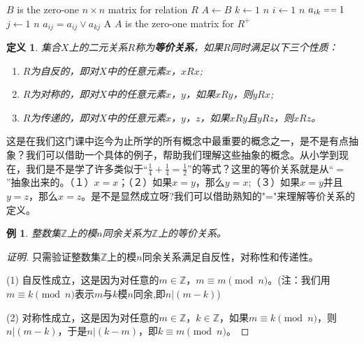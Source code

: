 \documentclass{book}[oneside]
\newtheorem{Def}{定义}[chapter]
\newtheorem{Example}{例}[chapter]
\begin{document}
\begin{CJK*}{UTF8}{gbsn}
    \begin{codebox}
    \zi \Comment $B$ is the zero-one $n \times n$ matrix for relation $R$
    \li $A \gets B$
    \li \For $k \gets 1$ \To $n$
    \li \Do
    \For $i \gets 1$ \To $n$
    \li \Do
     \If $a_{ik} \isequal 1$
    \li \Then
    \For $j \gets 1$ \To $n$
    \li \Do
    $a_{ij} = a_{ij} \lor a_{kj}$
    \End
    \End
    \End
    \End
    \li \Return A \Comment $A$ is the zero-one matrix for $R^+$
  \end{codebox}
  \begin{Def}
    集合$X$上的二元关系$R$称为{\bfseries 等价关系}，如果$R$同时满足以下三个性质：
    \begin{enumerate}
    \item $R$为自反的，即对$X$中的任意元素$x$，$xRx$;
    \item $R$为对称的，即对$X$中的任意元素$x$，$y$，如果$xRy$，则$yRx$;
    \item $R$为传递的，即对$X$中的任意元素$x$，$y$，$z$，如果$xRy$且$yRz$，则$xRz$。
    \end{enumerate}
  \end{Def}

  这是在我们这门课中迄今为止所学的所有概念中最重要的概念之一，是不是有点抽象？我们可以借助一个具体的例子，帮助我们理解这些抽象的概念。从小学到现在，我们是不是学了许多类似于“$\frac{1}{4}+\frac{1}{4}=\frac{1}{2}$”的等式？这里的等价关系就是从“$=$”抽象出来的。（１）$x=x$；（２）如果$x=y$，那么$y=x$;（３）如果$x=y$并且$y=z$，那么$x=z$。是不是显然成立呀?我们可以借助熟知的"="来理解等价关系的定义。
  \begin{Example}\label{mod}
    整数集$\mathbb{Z}$上的模$n$同余关系为$\mathbb{Z}$上的等价关系。
  \end{Example}
  \begin{proof}[证明]
    只需验证整数集$\mathbb{Z}$上的模$n$同余关系满足自反性，对称性和传递性。

    (1) 自反性成立，这是因为对任意的$m\in \mathbb{Z}$，$m\equiv m \pmod{n}$。(注：我们用$m\equiv k \pmod{n}$表示$m$与$k$模$n$同余,即$n | (m-k)$)

    (2) 对称性成立，这是因为对任意的$m\in \mathbb{Z}$，$k\in \mathbb{Z}$，如果$m\equiv k \pmod{n}$，则$n | (m-k)$，于是$n | (k-m)$，即$k\equiv m \pmod{n}$。


\end{proof}
\end{CJK*}
\end{document}
